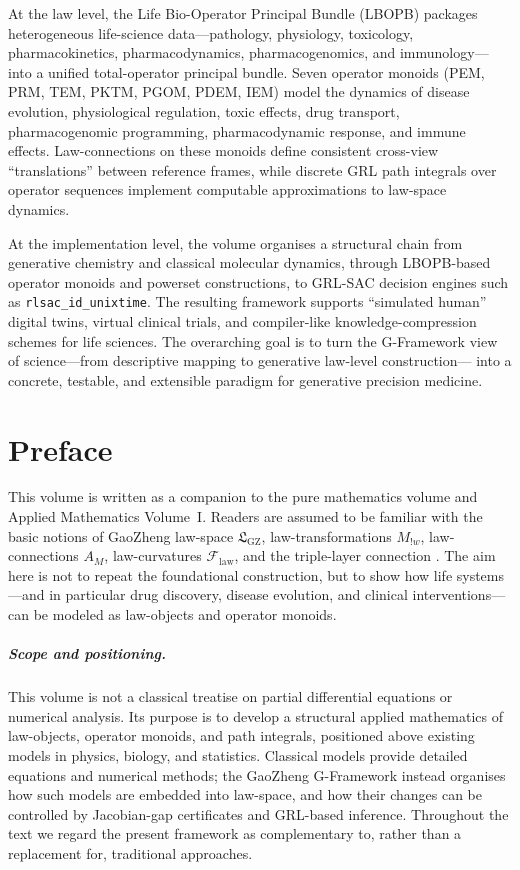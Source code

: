 \documentclass[11pt]{book}
\theoremstyle{plain}
\theoremstyle{definition}
\theoremstyle{remark}
\newcommand{\GZLS}{\ensuremath{\mathfrak{L}_{\mathrm{GZ}}}}       \newcommand{\GZLT}{\ensuremath{M_{!w}}}                           \newcommand{\GZLOC}{\ensuremath{A_M}}                             \newcommand{\GZLCurv}{\ensuremath{\mathcal{F}_{\mathrm{law}}}}
\begin{document}
At the law level, the Life Bio-Operator Principal Bundle (LBOPB)
packages heterogeneous life-science data—pathology, physiology,
toxicology, pharmacokinetics, pharmacodynamics, pharmacogenomics, and
immunology—into a unified total-operator principal bundle. Seven
operator monoids (PEM, PRM, TEM, PKTM, PGOM, PDEM, IEM) model the
dynamics of disease evolution, physiological regulation, toxic effects,
drug transport, pharmacogenomic programming, pharmacodynamic response,
and immune effects. Law-connections on these monoids define consistent
cross-view “translations” between reference frames, while discrete
GRL path integrals over operator sequences implement computable
approximations to law-space dynamics.

At the implementation level, the volume organises a structural chain from
generative chemistry and classical molecular dynamics, through LBOPB-based
operator monoids and powerset constructions, to GRL-SAC decision engines
such as \texttt{rlsac\_id\_unixtime}. The resulting framework supports
``simulated human'' digital twins, virtual clinical trials, and
compiler-like knowledge-compression schemes for life sciences. The
overarching goal is to turn the G-Framework view of
science—from descriptive mapping to generative law-level construction—
into a concrete, testable, and extensible paradigm for generative
precision medicine.

\chapter*{Preface}


This volume is written as a companion to the pure mathematics volume
\cite{GaoZheng2025GFramework} and Applied Mathematics Volume~I.
Readers are assumed to be familiar
with the basic notions of GaoZheng law-space $\GZLS$, law-transformations
$\GZLT$, law-connections $\GZLOC$, law-curvatures $\GZLCurv$, and the
triple-layer connection \GZTLC. The aim here is not to repeat the
foundational construction, but to show how life systems—and in
particular drug discovery, disease evolution, and clinical
interventions—can be modeled as law-objects and operator monoids.

\paragraph{Scope and positioning.}
This volume is not a classical treatise on partial differential
equations or numerical analysis. Its purpose is to develop a structural
applied mathematics of law-objects, operator monoids, and path
integrals, positioned above existing models in physics, biology, and
statistics. Classical models provide detailed equations and numerical
methods; the GaoZheng G-Framework instead organises how such models are
embedded into law-space, and how their changes can be controlled by
Jacobian-gap certificates and GRL-based inference. Throughout the text
we regard the present framework as complementary to, rather than a
replacement for, traditional approaches.
\end{document}

